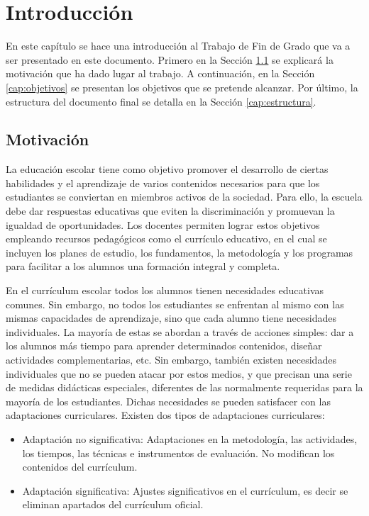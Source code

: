 \chapter{Introducción}
\label{ch:introduccion}

En este capítulo se hace una introducción al Trabajo de Fin de Grado que va a ser presentado en este documento. Primero en la Sección \ref{cap:motivacio} se explicará la motivación que ha dado lugar al trabajo. A continuación, en la Sección \ref{cap:objetivos} se presentan los objetivos que se pretende alcanzar. Por último, la estructura del documento final se detalla en la Sección \ref{cap:estructura}.

\section{Motivación}\label{cap:motivacio}
La educación escolar tiene como objetivo promover el desarrollo de ciertas habilidades y el aprendizaje de varios contenidos necesarios para que los estudiantes se conviertan en miembros activos de la sociedad. Para ello, la escuela debe dar respuestas educativas que eviten la discriminación y promuevan la igualdad de oportunidades. Los docentes permiten lograr estos objetivos empleando recursos pedagógicos como el currículo educativo, en el cual se incluyen los planes de estudio, los fundamentos, la metodología y los programas para facilitar a los alumnos una formación integral y completa.

En el currículum escolar todos los alumnos tienen necesidades educativas comunes. Sin embargo, no todos los estudiantes se enfrentan al mismo con las mismas capacidades de aprendizaje, sino que cada alumno tiene necesidades individuales. La mayoría de estas se abordan a través de acciones simples: dar a los alumnos más tiempo para aprender determinados contenidos, diseñar actividades complementarias, etc.  Sin embargo, también existen necesidades individuales que no se pueden atacar por estos medios, y que precisan una serie de medidas didácticas especiales, diferentes de las normalmente requeridas para la mayoría de los estudiantes. Dichas necesidades se pueden satisfacer con las adaptaciones curriculares. Existen dos tipos de adaptaciones curriculares:
\begin{itemize}
    \item Adaptación no significativa: Adaptaciones en la metodología, las actividades, los tiempos, las técnicas e instrumentos de evaluación. No modifican los contenidos del currículum.  
    \item Adaptación significativa: Ajustes significativos en el currículum, es decir se eliminan apartados del currículum oficial. 
\end{itemize}

